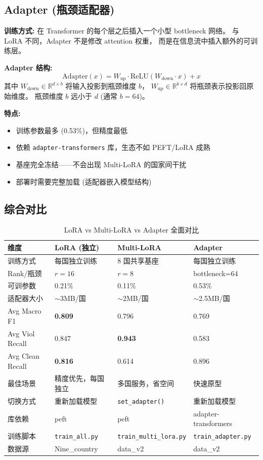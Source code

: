 \documentclass[11pt,a4paper]{article}
\begin{document}
\subsection{Adapter (瓶颈适配器)}

\textbf{训练方式:} 在 Transformer 的每个层之后插入一个小型 bottleneck 网络。
与 LoRA 不同，Adapter 不是修改 attention 权重，
而是在信息流中插入额外的可训练层。

\textbf{Adapter 结构:}
\[ \text{Adapter}(x) = W_{\text{up}} \cdot \text{ReLU}(W_{\text{down}} \cdot x) + x \]
其中 $W_{\text{down}} \in \mathbb{R}^{d \times b}$ 将输入投影到瓶颈维度 $b$，
$W_{\text{up}} \in \mathbb{R}^{b \times d}$ 将瓶颈表示投影回原始维度。
瓶颈维度 $b$ 远小于 $d$ (通常 $b=64$)。

\textbf{特点:}
\begin{itemize}
\item 训练参数最多 (0.53\%)，但精度最低
\item 依赖 \texttt{adapter-transformers} 库，生态不如 PEFT/LoRA 成熟
\item 基座完全冻结——不会出现 Multi-LoRA 的国家间干扰
\item 部署时需要完整加载 (适配器嵌入模型结构)
\end{itemize}

\subsection{综合对比}

\begin{table}[h]\centering
\caption{LoRA vs Multi-LoRA vs Adapter 全面对比}
\begin{tabular}{@{}lp{3.2cm}p{3.2cm}p{3.2cm}@{}}\toprule
\textbf{维度} & \textbf{LoRA (独立)} & \textbf{Multi-LoRA} & \textbf{Adapter} \\\midrule
训练方式 & 每国独立训练 & 8 国共享基座 & 每国独立训练 \\
Rank/瓶颈 & $r=16$ & $r=8$ & bottleneck=64 \\
可训参数 & 0.21\% & 0.11\% & 0.53\% \\
适配器大小 & $\sim$3MB/国 & $\sim$2MB/国 & $\sim$2.5MB/国 \\
Avg Macro F1 & \textbf{0.809} & 0.796 & 0.769 \\
Avg Viol Recall & 0.847 & \textbf{0.943} & 0.583 \\
Avg Clean Recall & \textbf{0.816} & 0.614 & 0.896 \\
最佳场景 & 精度优先，每国独立 & 多国服务，省空间 & 快速原型 \\
切换方式 & 重新加载模型 & \texttt{set\_adapter()} & 重新加载模型 \\
库依赖 & peft & peft & adapter-transformers \\
训练脚本 & \texttt{train\_all.py} & \texttt{train\_multi\_lora.py} & \texttt{train\_adapter.py} \\
数据源 & Nine\_country & data\_v2 & data\_v2 \\
\bottomrule
\end{tabular}
\end{table}
\end{document}
